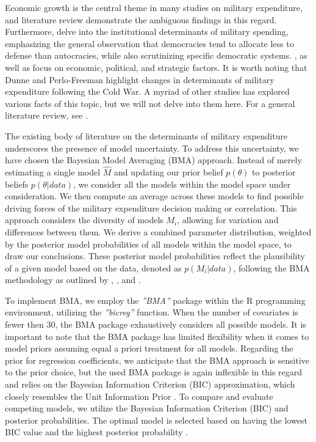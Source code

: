 \documentclass[12pt,a4paper]{article}
\begin{document}
Economic growth is the central theme in many studies on military expenditure, and \citet{lin2019} literature review demonstrate the ambiguous findings in this regard. Furthermore, \citet{albalate2012} delve into the institutional determinants of military spending, emphasizing the general observation that democracies tend to allocate less to defense than autocracies, while also scrutinizing specific democratic systems. \citet{dunne2003a,dunne2003b}, as well as \citet{nikolaidou2008} focus on economic, political, and strategic factors. It is worth noting that Dunne and Perlo-Freeman highlight changes in determinants of military expenditure following the Cold War. A myriad of other studies has explored various facts of this topic, but we will not delve into them here. For a general literature review, see \citet{albalate2012}. 

The existing body of literature on the determinants of military expenditure underscores the presence of model uncertainty. To address this uncertainty, we have chosen the Bayesian Model Averaging (BMA) approach. Instead of merely estimating a single model $\hat{M}$ and updating our prior belief $p(\theta)$ to posterior beliefs $p(\theta \vert data)$, we consider all the models within the model space under consideration. We then compute an average across these models to find possible driving forces of the military expenditure decision making or correlation. This approach considers the diversity of models $M_{i}$, allowing for variation and differences between them. We derive a combined parameter distribution, weighted by the posterior model probabilities of all models within the model space, to draw our conclusions. These posterior model probabilities reflect the plausibility of a given model based on the data, denoted as $p(M_{i}\vert data)$, following the BMA methodology as outlined by \citet{steel2020}, \citet{brown2002},  \citet{hoeting1999} and \citet{moral2015}.

To implement BMA, we employ the \textit{''BMA''} package within the R programming environment, utilizing the \textit{''bicreg''} function. When the number of covariates is fewer then 30, the BMA package exhaustively considers all possible models. It is important to note that the BMA package has limited flexibility when it comes to model priors assuming equal a priori treatment for all models. Regarding the prior for regression coefficients, we anticipate that the BMA approach is sensitive to the prior choice, but the used BMA package is again inflexible in this regard and relies on the Bayesian Information Criterion (BIC) approximation, which closely resembles the Unit Information Prior \citep{amini2012}. To compare and evaluate competing models, we utilize the Bayesian Information Criterion (BIC) and posterior probabilities. The optimal model is selected based on having the lowest BIC value and the highest posterior probability \citep{starkweather2011}.
\end{document}
